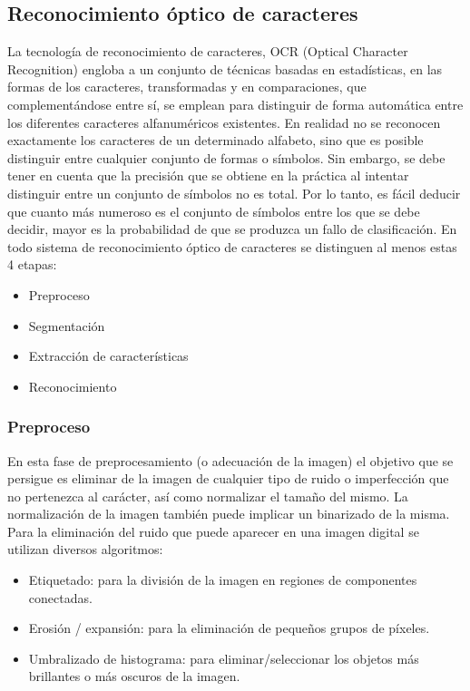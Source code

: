 \subsection{Reconocimiento óptico de caracteres}

La tecnología de reconocimiento de caracteres, OCR (Optical Character  Recognition)  engloba  a  un  conjunto  de  técnicas basadas en  estadísticas, en las formas de los caracteres, transformadas y en comparaciones, que complementándose entre sí, se  emplean para  distinguir de forma automática entre  los diferentes caracteres alfanuméricos existentes.
En realidad no se reconocen  exactamente los  caracteres de un determinado alfabeto, sino que es posible distinguir entre cualquier conjunto de formas o símbolos. Sin embargo, se debe tener en cuenta que la precisión que se obtiene en la práctica al intentar distinguir entre un conjunto de símbolos no es total. Por lo tanto, es fácil  deducir  que  cuanto  más  numeroso  es  el conjunto de símbolos entre los que se debe decidir, mayor es la probabilidad de que se produzca un fallo de clasificación.
En todo sistema de reconocimiento óptico de caracteres se distinguen al menos estas 4 etapas:
\begin{itemize}
    \item Preproceso
    \item Segmentación
    \item Extracción de características
    \item Reconocimiento
\end{itemize}


\subsubsection{Preproceso}

En esta fase de preprocesamiento (o adecuación de la imagen) el objetivo que se persigue es eliminar de la imagen de cualquier
tipo de ruido o imperfección que no pertenezca al carácter, así como normalizar el tamaño del mismo. La normalización de la imagen también puede implicar un binarizado de la misma. Para la eliminación del ruido que puede aparecer en una imagen digital se utilizan diversos algoritmos:
\begin{itemize}
    \item Etiquetado:  para  la  división  de  la  imagen  en  regiones  de componentes conectadas.
    \item Erosión / expansión: para la eliminación de peque\~nos grupos de píxeles.
    \item Umbralizado de histograma:  para  eliminar/seleccionar los objetos más brillantes o más oscuros de la imagen.
\end{itemize}


